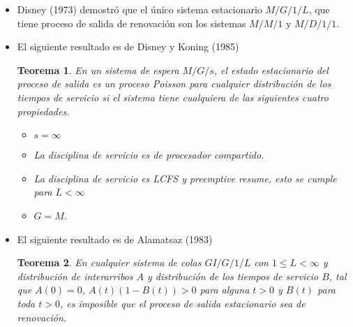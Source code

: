 \documentclass{article}
\newtheorem{Teo}{Teorema}[section]
\numberwithin{equation}{section}
\begin{document}
\begin{itemize}
\item Disney (1973) demostr\'o que el \'unico sistema estacionario $M/G/1/L$, que tiene proceso de salida de renovaci\'on  son los sistemas $M/M/1$ y $M/D/1/1$.



\item El siguiente resultado es de Disney y Koning (1985)
\begin{Teo}
En un sistema de espera $M/G/s$, el estado estacionario del proceso de salida es un proceso Poisson para cualquier distribuci\'on de los tiempos de servicio si el sistema tiene cualquiera de las siguientes cuatro propiedades.

\begin{itemize}
\item[a)] $s=\infty$
\item[b)] La disciplina de servicio es de procesador compartido.
\item[c)] La disciplina de servicio es LCFS y preemptive resume, esto se cumple para $L<\infty$
\item[d)] $G=M$.
\end{itemize}

\end{Teo}

\item El siguiente resultado es de Alamatsaz (1983)

\begin{Teo}
En cualquier sistema de colas $GI/G/1/L$ con $1\leq L<\infty$ y distribuci\'on de interarribos $A$ y distribuci\'on de los tiempos de servicio $B$, tal que $A\left(0\right)=0$, $A\left(t\right)\left(1-B\left(t\right)\right)>0$ para alguna $t>0$ y $B\left(t\right)$ para toda $t>0$, es imposible que el proceso de salida estacionario sea de renovaci\'on.
\end{Teo}

\end{itemize}



\end{document}
